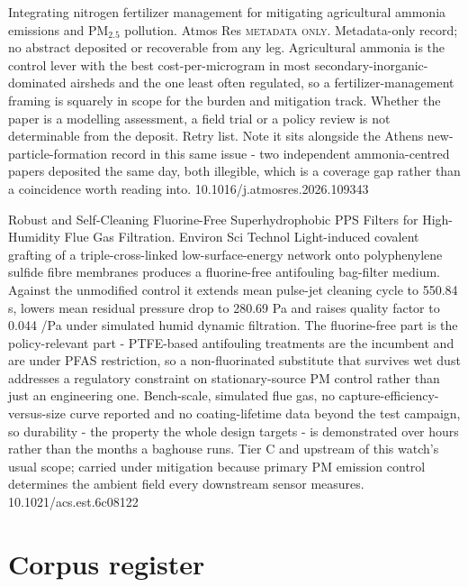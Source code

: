 \documentclass[10pt]{article}
\begin{document}

{Integrating nitrogen fertilizer management for mitigating agricultural ammonia emissions and PM$_{2.5}$ pollution.}
{Atmos Res}
{\textsc{metadata only.} Metadata-only record; no abstract deposited or recoverable from any leg. Agricultural ammonia is the control lever with the best cost-per-microgram in most secondary-inorganic-dominated airsheds and the one least often regulated, so a fertilizer-management framing is squarely in scope for the burden and mitigation track. Whether the paper is a modelling assessment, a field trial or a policy review is not determinable from the deposit. Retry list. Note it sits alongside the Athens new-particle-formation record in this same issue - two independent ammonia-centred papers deposited the same day, both illegible, which is a coverage gap rather than a coincidence worth reading into.}
{10.1016/j.atmosres.2026.109343}

{Robust and Self-Cleaning Fluorine-Free Superhydrophobic PPS Filters for High-Humidity Flue Gas Filtration.}
{Environ Sci Technol}
{Light-induced covalent grafting of a triple-cross-linked low-surface-energy network onto polyphenylene sulfide fibre membranes produces a fluorine-free antifouling bag-filter medium. Against the unmodified control it extends mean pulse-jet cleaning cycle to 550.84 s, lowers mean residual pressure drop to 280.69 Pa and raises quality factor to 0.044 /Pa under simulated humid dynamic filtration. The fluorine-free part is the policy-relevant part - PTFE-based antifouling treatments are the incumbent and are under PFAS restriction, so a non-fluorinated substitute that survives wet dust addresses a regulatory constraint on stationary-source PM control rather than just an engineering one. Bench-scale, simulated flue gas, no capture-efficiency-versus-size curve reported and no coating-lifetime data beyond the test campaign, so durability - the property the whole design targets - is demonstrated over hours rather than the months a baghouse runs. Tier C and upstream of this watch's usual scope; carried under mitigation because primary PM emission control determines the ambient field every downstream sensor measures.}
{10.1021/acs.est.6c08122}
\section*{\sffamily\bfseries\color{Deep}Corpus register}
\vspace{-1.5mm}{\color{Amber}\rule{\linewidth}{1.1pt}}\vspace{2.5mm}
\end{document}
